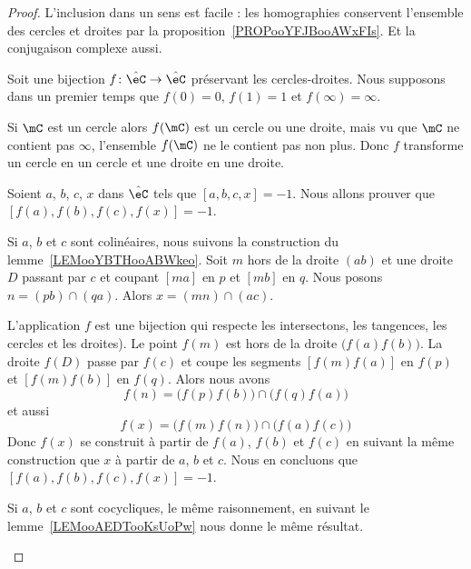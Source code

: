 \begin{proof}
	L'inclusion dans un sens est facile : les homographies conservent l'ensemble des cercles et droites par la proposition~\ref{PROPooYFJBooAWxFIs}. Et la conjugaison complexe aussi.

	Soit une bijection \( f\colon \hat \eC\to \hat\eC\) préservant les cercles-droites. Nous supposons dans un premier temps que \( f(0)=0\), \( f(1)=1\) et \( f(\infty)=\infty\).

	\begin{subproof}
		\spitem[Pour \( f\) vérifiant \( f(0,1,\infty)=0,1,\infty\)]

		Si \( \mC\) est un cercle alors \( f(\mC)\) est un cercle ou une droite, mais vu que \( \mC\) ne contient pas \( \infty\), l'ensemble \( f(\mC)\) ne le contient pas non plus. Donc \( f\) transforme un cercle en un cercle et une droite en une droite.

		\begin{subproof}

			Soient \( a\), \( b\), \( c\), \( x\) dans \( \hat\eC\) tels que \( [a,b,c,x]=-1\). Nous allons prouver que \( [f(a),f(b),f(c),f(x)]=-1\).


			Si \( a\), \( b\) et \( c\) sont colinéaires, nous suivons la construction du lemme~\ref{LEMooYBTHooABWkeo}. Soit \( m\) hors de la droite \( (ab)\) et une droite \( D\) passant par \( c\) et coupant \( [ma]\) en \( p\) et \( [mb]\) en \( q\). Nous posons \( n=(pb)\cap(qa)\). Alors \( x=(mn)\cap(ac)\).

			L'application \( f\) est une bijection qui respecte les intersectons, les tangences, les cercles et les droites). Le point \( f(m)\) est hors de la droite \( \big( f(a)f(b) \big)\). La droite \( f(D)\) passe par \( f(c)\) et coupe les segments \( [f(m)f(a)]\) en \( f(p)\) et \( [f(m)f(b)]\) en \( f(q)\). Alors nous avons
			\begin{equation}
				f(n)=\big( f(p)f(b) \big)\cap\big( f(q)f(a) \big)
			\end{equation}
			et aussi
			\begin{equation}
				f(x)=\big( f(m)f(n) \big)\cap\big( f(a)f(c) \big)
			\end{equation}
			Donc \( f(x)\) se construit à partir de \( f(a)\), \( f(b)\) et \( f(c)\) en suivant la même construction que \( x\) à partir de \( a\), \( b\) et \( c\). Nous en concluons que \( [f(a), f(b),f(c),f(x)]=-1\).

			Si \( a\), \( b\) et \( c\) sont cocycliques, le même raisonnement, en suivant le lemme~\ref{LEMooAEDTooKsUoPw} nous donne le même résultat.


\end{subproof}
\end{subproof}
\end{proof}
